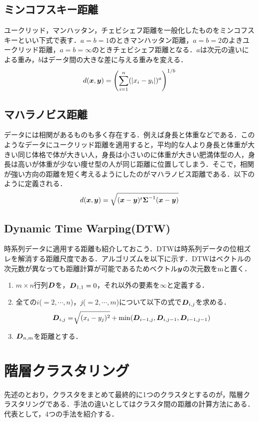 \documentclass[a4j]{jsarticle}
\def\vec#1{\mbox{\boldmath $#1$}}
\begin{document}
\subsection{ミンコフスキー距離}
ユークリッド，マンハッタン，チェビシェフ距離を一般化したものをミンコフスキーといい下式で表す．$a=b=1$のときマンハッタン距離，$a=b=2$のよきユークリッド距離，$a=b=\infty$のときチェビシェフ距離となる．$a$は次元の違いによる重み，$b$はデータ間の大きな差に与える重みを変える．
\begin{equation}
	d(\vec{x},\vec{y}) = \left(\sum_{i=1}^{n}(|x_i-y_i|)^a\right)^{1/b}
\end{equation}
\subsection{マハラノビス距離}
データには相関があるものも多く存在する．例えば身長と体重などである．このようなデータにユークリッド距離を適用すると，平均的な人より身長と体重が大きい同じ体格で体が大きい人，身長は小さいのに体重が大きい肥満体型の人，身長は高いが体重が少ない痩せ型の人が同じ距離に位置してしまう．そこで，相関が強い方向の距離を短く考えるようにしたのがマハラノビス距離である．以下のように定義される．
\begin{equation}
	d(\vec{x},\vec{y}) = \sqrt{(\vec{x}-\vec{y})^t \vec{\Sigma}^{-1}(\vec{x}-\vec{y})}
\end{equation}
\subsection{Dynamic Time Warping(DTW)}
時系列データに適用する距離も紹介しておこう．DTWは時系列データの位相ズレを解消する距離尺度である．アルゴリズムを以下に示す．DTWはベクトルの次元数が異なっても距離計算が可能であるためベクトル$\vec{y}$の次元数をmと置く．
\begin{enumerate}
  \item $m\times n$行列$\vec{D}$を，$\vec{D}_{1,1}=0$，それ以外の要素を$\infty$と定義する．
  \item 全ての$i$($=2,\cdots,n$)，$j$($=2,\cdots,m$)について以下の式で$\vec{D}_{i,j}$を求める．
  \begin{align}
    \vec{D}_{i,j}=&\sqrt[~]{\mathstrut(x_{i}-y_{j})^2}+ \min(\vec{D}_{i-1,j},\vec{D}_{i,j-1},\vec{D}_{i-1,j-1})
  \end{align}
  \item $\vec{D}_{n,m}$を距離とする．
\end{enumerate}


\section{階層クラスタリング}
先述のとおり，クラスタをまとめて最終的に1つのクラスタとするのが，階層クラスタリングである．手法の違いとしてはクラスタ間の距離の計算方法にある．代表として，4つの手法を紹介する．
\end{document}
